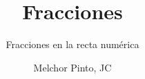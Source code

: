 \documentclass{guia}
\title{Fracciones}
\subtitle{Fracciones en la recta numérica}
\author{Melchor Pinto, JC}
\begin{document}
%
\begin{questions}
\questionboxed{}
\end{questions}
\end{document}
